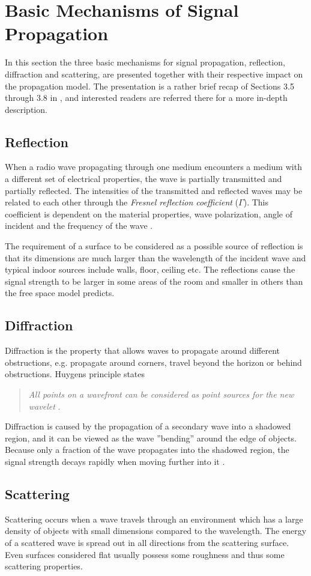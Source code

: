 \documentclass{LTHthesis}
\begin{document}
\section{Basic Mechanisms of Signal Propagation}
%
In this section the three basic mechanisms for signal propagation, reflection, diffraction and scattering, are presented together with their respective impact on the propagation model. The presentation is a rather brief recap of Sections 3.5 through 3.8 in  \cite{rappaport96}, and interested readers are referred there for a more in-depth description.  
%
\subsection{Reflection}
%
When a radio wave propagating through one medium encounters a medium with a different set of electrical properties, the wave is partially transmitted and partially reflected. The intensities of the transmitted and reflected waves may be related to each other through the \emph{Fresnel reflection coefficient} ($\Gamma$). This coefficient is dependent on the material properties, wave polarization, angle of incident and the frequency of the wave \cite{rappaport96}.

The requirement of a surface to be considered as a possible source of reflection is that its dimensions are much larger than the wavelength of the incident wave and typical indoor sources include walls, floor, ceiling etc. The reflections cause the signal strength to be larger in some areas of the room and smaller in others than the free space model predicts.
%
\subsection{Diffraction}
%
Diffraction is the property that allows waves to propagate around different obstructions, e.g. propagate  around corners, travel beyond the horizon or behind obstructions. Huygens principle states 
\begin{quote}
 \emph{All points on a wavefront can be considered as point sources for the new wavelet} \cite{rappaport96}.
 \end{quote}
%
Diffraction is caused by the propagation of a secondary wave into a shadowed region, and it can be viewed as the wave ''bending'' around the edge of objects. Because only a fraction of the wave propagates into the shadowed region, the signal strength decays rapidly when moving further into it \cite{rappaport96}.
%
\subsection{Scattering}
%
Scattering occurs when a wave travels through an environment which has a large density of objects with small dimensions compared to the wavelength. The energy of a scattered wave is spread out in all directions from the scattering surface. Even surfaces considered flat usually possess some roughness and thus some scattering properties.
%
\end{document}
